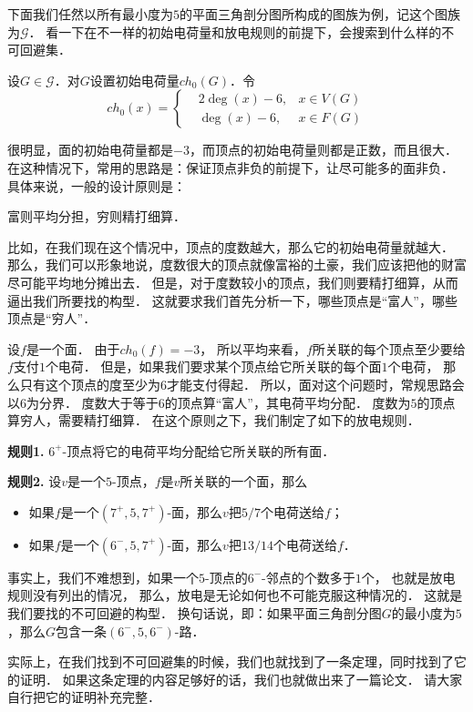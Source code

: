 \documentclass[cn,fancy,blue,11pt]{elegantbook}
\begin{document}
下面我们任然以所有最小度为$5$的平面三角剖分图所构成的图族为例，记这个图族为$\mathcal{G}$．
看一下在不一样的初始电荷量和放电规则的前提下，会搜索到什么样的不可回避集．

设$G\in \mathcal{G}$．对$G$设置初始电荷量$ch_0(G)$．令
\[
	ch_0(x)=\left\{
		\begin{aligned}
			& 2\deg(x)-6,	& x\in V(G)\\
			& \deg(x)-6,	& x\in F(G)
		\end{aligned}
	\right.
\]

很明显，面的初始电荷量都是$-3$，而顶点的初始电荷量则都是正数，而且很大．
在这种情况下，常用的思路是：保证顶点非负的前提下，让尽可能多的面非负．
具体来说，一般的设计原则是：
\begin{framed}
	富则平均分担，穷则精打细算．
\end{framed}

比如，在我们现在这个情况中，顶点的度数越大，那么它的初始电荷量就越大．
那么，我们可以形象地说，度数很大的顶点就像富裕的土豪，我们应该把他的财富尽可能平均地分摊出去．
但是，对于度数较小的顶点，我们则要精打细算，从而逼出我们所要找的构型．
这就要求我们首先分析一下，哪些顶点是``富人''，哪些顶点是``穷人''．

设$f$是一个面．
由于$ch_0(f)=-3$，
所以平均来看，$f$所关联的每个顶点至少要给$f$支付$1$个电荷．
但是，如果我们要求某个顶点给它所关联的每个面$1$个电荷，
那么只有这个顶点的度至少为$6$才能支付得起．
所以，面对这个问题时，常规思路会以$6$为分界．
度数大于等于$6$的顶点算``富人''，其电荷平均分配．
度数为$5$的顶点算穷人，需要精打细算．
在这个原则之下，我们制定了如下的放电规则．
\begin{discharge}
	\textbf{规则1.} $6^+$-顶点将它的电荷平均分配给它所关联的所有面．

	\textbf{规则2.} 设$v$是一个$5$-顶点，$f$是$v$所关联的一个面，那么
	\begin{itemize}
		\item 如果$f$是一个$(7^+,5,7^+)$-面，那么$v$把$5/7$个电荷送给$f$；
		\item 如果$f$是一个$(6^-,5,7^+)$-面，那么$v$把$13/14$个电荷送给$f$．
	\end{itemize}
\end{discharge}

事实上，我们不难想到，如果一个$5$-顶点的$6^-$-邻点的个数多于$1$个，
也就是放电规则没有列出的情况，
那么，放电是无论如何也不可能克服这种情况的．
这就是我们要找的不可回避的构型．
换句话说，即：如果平面三角剖分图$G$的最小度为$5$，那么$G$包含一条$(6^-,5,6^-)$-路．

实际上，在我们找到不可回避集的时候，我们也就找到了一条定理，同时找到了它的证明．
如果这条定理的内容足够好的话，我们也就做出来了一篇论文．
请大家自行把它的证明补充完整．
\end{document}
